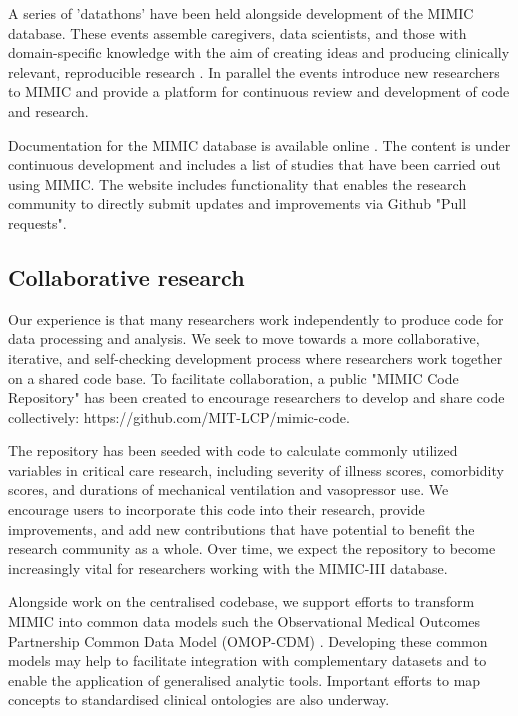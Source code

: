 \documentclass[english]{article}
\begin{document}

A series of 'datathons' have been held alongside development of the MIMIC database. These events assemble caregivers, data scientists, and those with domain-specific knowledge with the aim of creating ideas and producing clinically relevant, reproducible research \cite{cite7}. In parallel the events introduce new researchers to MIMIC and provide a platform for continuous review and development of code and research.

Documentation for the MIMIC database is available online \cite{cite-mimic-website}. The content is under continuous development and includes a list of studies that have been carried out using MIMIC. The website includes functionality that enables the research community to directly submit updates and improvements via Github "Pull requests".

\subsection*{Collaborative research}

Our experience is that many researchers work independently to produce code for data processing and analysis. We seek to move towards a more collaborative, iterative, and self-checking development process where researchers work together on a shared code base. To facilitate collaboration, a public "MIMIC Code Repository" has been created to encourage researchers to develop and share code collectively: https://github.com/MIT-LCP/mimic-code. 

The repository has been seeded with code to calculate commonly utilized variables in critical care research, including severity of illness scores, comorbidity scores, and durations of mechanical ventilation and vasopressor use. We encourage users to incorporate this code into their research, provide improvements, and add new contributions that have potential to benefit the research community as a whole. Over time, we expect the repository to become increasingly vital for researchers working with the MIMIC-III database.

Alongside work on the centralised codebase, we support efforts to transform MIMIC into common data models such the Observational Medical Outcomes Partnership Common Data Model (OMOP-CDM) \cite{cite8}. Developing these common models may help to facilitate integration with complementary datasets and to enable the application of generalised analytic tools. Important efforts to map concepts to standardised clinical ontologies are also underway.
\end{document}
